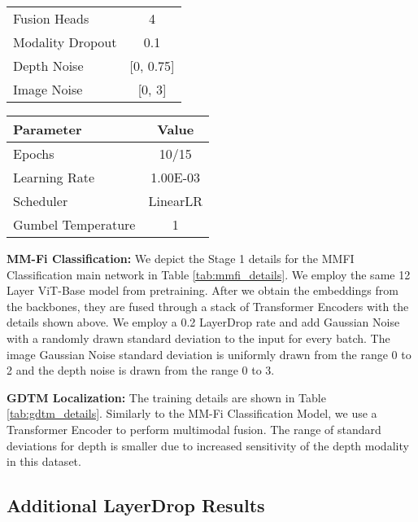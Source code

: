 \begin{table*}[h]
\begin{minipage}[t]{0.33\linewidth}
\begin{tabular}{lc}
Fusion Heads            & 4              \\
Modality Dropout        & 0.1            \\
Depth Noise             & [0, 0.75]      \\
Image Noise             & [0, 3]         \\
\bottomrule
\end{tabular}
\caption{\textbf{GDTM Finetuning}}
\label{tab:gdtm_details}
\end{minipage}%
\hfill
\begin{minipage}[t]{0.33\linewidth}
\centering
\begin{tabular}{lc}
\toprule
\textbf{Parameter}      & \textbf{Value} \\ 
\midrule
Epochs                  & 10/15             \\
Learning Rate           & 1.00E-03       \\
Scheduler               & LinearLR       \\
Gumbel Temperature      & 1              \\
\bottomrule
\end{tabular}
\caption{\textbf{Controller Training}}
\label{tab:controller_details}
\end{minipage}
\end{table*}



\textbf{MM-Fi Classification: } We depict the Stage 1 details for the MMFI Classification main network in Table \ref{tab:mmfi_details}. We employ the same 12 Layer ViT-Base model from pretraining. After we obtain the embeddings from the backbones, they are fused through a stack of Transformer Encoders with the details shown above. We employ a 0.2 LayerDrop rate and add Gaussian Noise with a randomly drawn standard deviation to the input for every batch. The image Gaussian Noise standard deviation is uniformly drawn from the range 0 to 2 and the depth noise is drawn from the range 0 to 3.  

\textbf{GDTM Localization: } The training details are shown in Table \ref{tab:gdtm_details}. Similarly to the MM-Fi Classification Model, we use a Transformer Encoder to perform multimodal fusion. The range of standard deviations for depth is smaller due to increased sensitivity of the depth modality in this dataset. 



\subsection{Additional LayerDrop Results}
\label{appendix:layerdrop}

